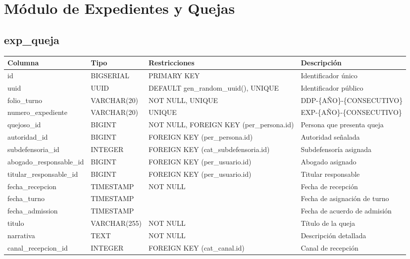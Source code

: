 \documentclass[12pt, a4paper]{article}
\begin{document}
\section{Módulo de Expedientes y Quejas}
\label{sec:expedientes}

\subsection{exp\_queja}
\begin{longtable}{|p{3.5cm}|p{2.5cm}|p{3cm}|p{5cm}|}
    \hline
    \rowcolor[gray]{0.9}
    \textbf{Columna} & \textbf{Tipo} & \textbf{Restricciones} & \textbf{Descripción} \\
    \hline
    id & BIGSERIAL & PRIMARY KEY & Identificador único \\
    \hline
    uuid & UUID & DEFAULT gen\_random\_uuid(), UNIQUE & Identificador público \\
    \hline
    folio\_turno & VARCHAR(20) & NOT NULL, UNIQUE & DDP-\{AÑO\}-\{CONSECUTIVO\} \\
    \hline
    numero\_expediente & VARCHAR(20) & UNIQUE & EXP-\{AÑO\}-\{CONSECUTIVO\} \\
    \hline
    quejoso\_id & BIGINT & NOT NULL, FOREIGN KEY (per\_persona.id) & Persona que presenta queja \\
    \hline
    autoridad\_id & BIGINT & FOREIGN KEY (per\_persona.id) & Autoridad señalada \\
    \hline
    subdefensoria\_id & INTEGER & FOREIGN KEY (cat\_subdefensoria.id) & Subdefensoría asignada \\
    \hline
    abogado\_responsable\_id & BIGINT & FOREIGN KEY (per\_usuario.id) & Abogado asignado \\
    \hline
    titular\_responsable\_id & BIGINT & FOREIGN KEY (per\_usuario.id) & Titular responsable \\
    \hline
    fecha\_recepcion & TIMESTAMP & NOT NULL & Fecha de recepción \\
    \hline
    fecha\_turno & TIMESTAMP & & Fecha de asignación de turno \\
    \hline
    fecha\_admission & TIMESTAMP & & Fecha de acuerdo de admisión \\
    \hline
    titulo & VARCHAR(255) & NOT NULL & Título de la queja \\
    \hline
    narrativa & TEXT & NOT NULL & Descripción detallada \\
    \hline
    canal\_recepcion\_id & INTEGER & FOREIGN KEY (cat\_canal.id) & Canal de recepción \\

\end{longtable}
\end{document}
